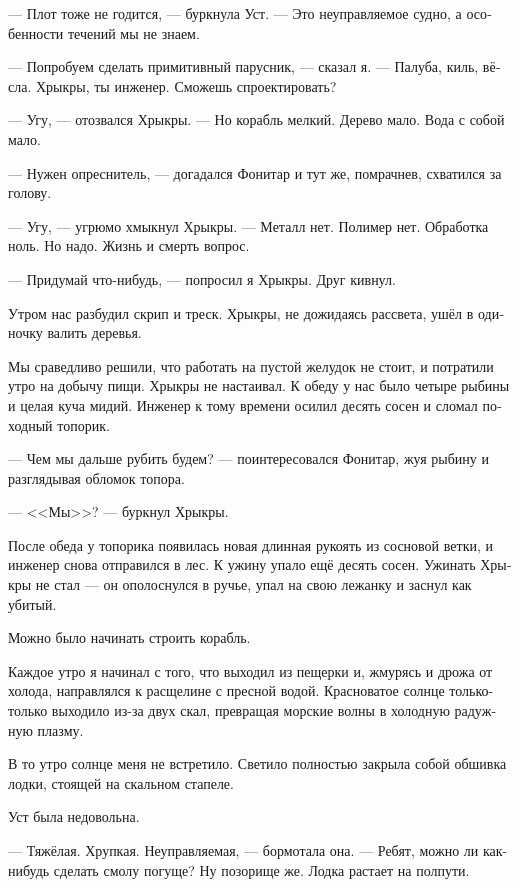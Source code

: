 \documentclass[a4paper,10pt,fleqn]{book}\usepackage{polyglossia}\setdefaultlanguage[babelshorthands=true]{russian}\setotherlanguage{english}\defaultfontfeatures{Ligatures=TeX,Mapping=tex-text}
\newcommand{\asterism}{\vspace{1em}{\centering\Large\bfseries$\ast~\ast~\ast$\par}\vspace{1em}}
\begin{document}
--- Плот тоже не годится, --- буркнула Уст.
--- Это неуправляемое судно, а особенности течений мы не знаем.

--- Попробуем сделать примитивный парусник, --- сказал я.
--- Палуба, киль, вёсла.
Хрыкры, ты инженер.
Сможешь спроектировать?

--- Угу, --- отозвался Хрыкры.
--- Но корабль мелкий.
Дерево мало.
Вода с собой мало.

--- Нужен опреснитель, --- догадался Фонитар и тут же, помрачнев, схватился за голову.

--- Угу, --- угрюмо хмыкнул Хрыкры.
--- Металл нет.
Полимер нет.
Обработка ноль.
Но надо.
Жизнь и смерть вопрос.

--- Придумай что-нибудь, --- попросил я Хрыкры.
Друг кивнул.

\asterism

Утром нас разбудил скрип и треск.
Хрыкры, не дожидаясь рассвета, ушёл в одиночку валить деревья.

Мы сраведливо решили, что работать на пустой желудок не стоит, и потратили утро на добычу пищи.
Хрыкры не настаивал.
К обеду у нас было четыре рыбины и целая куча мидий.
Инженер к тому времени осилил десять сосен и сломал походный топорик.

--- Чем мы дальше рубить будем? --- поинтересовался Фонитар, жуя рыбину и разглядывая обломок топора.

--- <<Мы>>? --- буркнул Хрыкры.

После обеда у топорика появилась новая длинная рукоять из сосновой ветки, и инженер снова отправился в лес.
К ужину упало ещё десять сосен.
Ужинать Хрыкры не стал --- он ополоснулся в ручье, упал на свою лежанку и заснул как убитый.

Можно было начинать строить корабль.

\asterism

Каждое утро я начинал с того, что выходил из пещерки и, жмурясь и дрожа от холода, направлялся к расщелине с пресной водой.
Красноватое солнце только-только выходило из-за двух скал, превращая морские волны в холодную радужную плазму.

В то утро солнце меня не встретило.
Светило полностью закрыла собой обшивка лодки, стоящей на скальном стапеле.

Уст была недовольна.

--- Тяжёлая.
Хрупкая.
Неуправляемая, --- бормотала она.
--- Ребят, можно ли как-нибудь сделать смолу погуще?
Ну позорище же.
Лодка растает на полпути.
\end{document}
